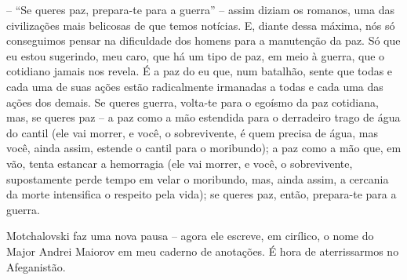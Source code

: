 -- ``Se queres paz, prepara-te para a guerra'' -- assim diziam os
romanos, uma das civilizações mais belicosas de que temos notícias. E,
diante dessa máxima, nós só conseguimos pensar na dificuldade dos homens
para a manutenção da paz. Só que eu estou sugerindo, meu caro, que há um
tipo de paz, em meio à guerra, que o cotidiano jamais nos revela. É a
paz do eu que, num batalhão, sente que todas e cada uma de suas ações
estão radicalmente irmanadas a todas e cada uma das ações dos demais. Se
queres guerra, volta-te para o egoísmo da paz cotidiana, mas, se queres
paz -- a paz como a mão estendida para o derradeiro trago de água do
cantil (ele vai morrer, e você, o sobrevivente, é quem precisa de água,
mas você, ainda assim, estende o cantil para o moribundo); a paz como a
mão que, em vão, tenta estancar a hemorragia (ele vai morrer, e você, o
sobrevivente, supostamente perde tempo em velar o moribundo, mas, ainda
assim, a cercania da morte intensifica o respeito pela vida); se queres
paz, então, prepara-te para a guerra.

Motchalovski faz uma nova pausa -- agora ele escreve, em cirílico, o
nome do Major Andrei Maiorov em meu caderno de anotações. É hora de
aterrissarmos no Afeganistão.

